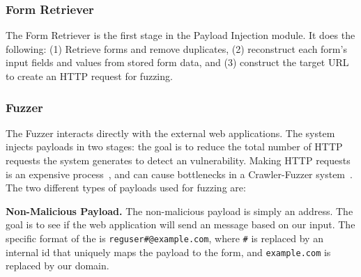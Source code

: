 \vspace{-1.5ex}
\subsubsection{\Email Form Retriever}
\label{Comp:EMFR}
The \Email Form Retriever is the first stage in the Payload Injection
module. It does the following: (1) Retrieve forms and
remove duplicates, (2) reconstruct
each form's input fields and values from stored form data, and (3) construct the target URL
to create an HTTP request for fuzzing.
\vspace{-1.5ex}

\subsubsection{Fuzzer}
\label{Comp:Fuzzer}
The Fuzzer interacts directly with the external web applications. The system injects payloads in two stages: the goal is to reduce the total number of HTTP requests the system generates to detect an \ehi vulnerability. Making HTTP requests is an expensive process~\cite{httpperf}, and can cause bottlenecks in a Crawler-Fuzzer system~\cite{ShkapenyukTorstenSuel2001}.
The two different types of payloads used for fuzzing are:

\noindent\textbf{Non-Malicious Payload.}
The non-malicious payload is simply an \email address. The goal is to see if the web application will send an \email message based on our input. The specific format of the \email is \lstinline|reguser#@example.com|, where \texttt{\#} is replaced by an internal id that uniquely maps the payload to the form, and \texttt{example.com} is replaced by our domain.

